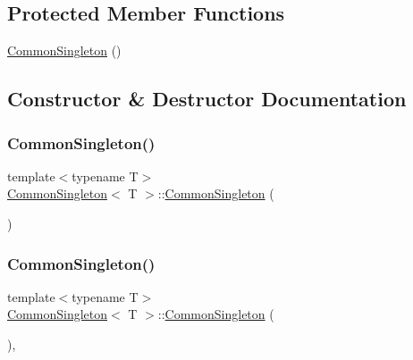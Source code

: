 \subsection*{Protected Member Functions}
\begin{DoxyCompactItemize}
\item 
\mbox{\hyperlink{class_common_singleton_ab5610129162f0b9b3d47d3c3eb9425e2}{Common\+Singleton}} ()
\end{DoxyCompactItemize}


\subsection{Constructor \& Destructor Documentation}
\mbox{\label{class_common_singleton_a00a83433e7f0b2895e436a8426ff5044}} 
\subsubsection{\texorpdfstring{CommonSingleton()}{CommonSingleton()}\hspace{0.1cm}{\footnotesize\ttfamily [1/2]}}
{\footnotesize\ttfamily template$<$typename T$>$ \\
\mbox{\hyperlink{class_common_singleton}{Common\+Singleton}}$<$ T $>$\+::\mbox{\hyperlink{class_common_singleton}{Common\+Singleton}} (\begin{DoxyParamCaption}\item[{const \mbox{\hyperlink{class_common_singleton}{Common\+Singleton}}$<$ T $>$ \&}]{ }\end{DoxyParamCaption})\hspace{0.3cm}{\ttfamily [delete]}}

\mbox{\label{class_common_singleton_ab5610129162f0b9b3d47d3c3eb9425e2}} 
\subsubsection{\texorpdfstring{CommonSingleton()}{CommonSingleton()}\hspace{0.1cm}{\footnotesize\ttfamily [2/2]}}
{\footnotesize\ttfamily template$<$typename T$>$ \\
\mbox{\hyperlink{class_common_singleton}{Common\+Singleton}}$<$ T $>$\+::\mbox{\hyperlink{class_common_singleton}{Common\+Singleton}} (\begin{DoxyParamCaption}{ }\end{DoxyParamCaption})\hspace{0.3cm}{\ttfamily [inline]}, {\ttfamily [protected]}}



